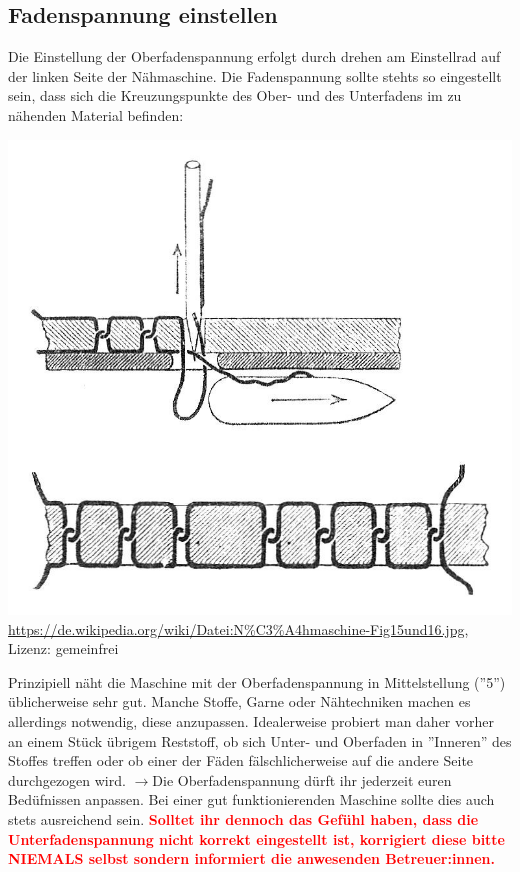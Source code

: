 \documentclass{\basedir/fablab-document}
\newcommand{\pfeil}{\ensuremath{\rightarrow}}
\begin{document}
\subsection{Fadenspannung einstellen}
Die Einstellung der Oberfadenspannung erfolgt durch drehen am Einstellrad auf der linken Seite der Nähmaschine.
Die Fadenspannung sollte stehts so eingestellt sein, dass sich die Kreuzungspunkte des Ober- und des Unterfadens im zu nähenden Material befinden:
\begin{center}
	\includegraphics[width=\linewidth/2]{seam.jpg}
	\url{https://de.wikipedia.org/wiki/Datei:N%C3%A4hmaschine-Fig15und16.jpg},
	Lizenz: gemeinfrei
\end{center}
Prinzipiell näht die Maschine mit der Oberfadenspannung in Mittelstellung (''5'') üblicherweise sehr gut.
Manche Stoffe, Garne oder Nähtechniken machen es allerdings notwendig, diese anzupassen.
Idealerweise probiert man daher vorher an einem Stück übrigem Reststoff, ob sich Unter- und Oberfaden in ''Inneren'' des Stoffes treffen oder ob einer der Fäden fälschlicherweise auf die andere Seite durchgezogen wird.
\newline
\pfeil Die Oberfadenspannung dürft ihr jederzeit euren Bedüfnissen anpassen. Bei einer gut funktionierenden Maschine sollte dies auch stets ausreichend sein. 
\newline
\textcolor{red}{\textbf{Solltet ihr dennoch das Gefühl haben, dass die Unterfadenspannung nicht korrekt eingestellt ist, korrigiert diese bitte NIEMALS selbst sondern informiert die anwesenden Betreuer:innen.}}
\end{document}
